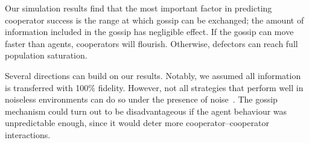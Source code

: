 \documentclass[runningheads]{llncs}
\begin{document}



Our simulation results find that the most important factor in predicting cooperator success is the range at which gossip can be exchanged; the amount of information included in the gossip has negligible effect.
If the gossip can move faster than agents, cooperators will flourish. Otherwise, defectors can reach full population saturation.

Several directions can build on our results.
Notably, we assumed all information is transferred with 100\% fidelity.  However,
not all strategies that perform well in noiseless environments can do so under the presence of noise~\cite{noise}.
The gossip mechanism could turn out to be disadvantageous if the agent behaviour was unpredictable enough, since it would deter more cooperator--cooperator interactions.




%
\renewcommand{\bibsection}{\section*{References}} %


\end{document}
